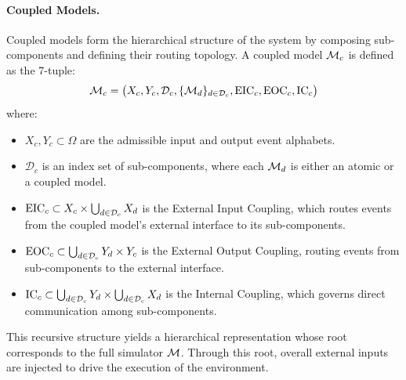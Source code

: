 \paragraph{Coupled Models.}
Coupled models form the hierarchical structure of the system by composing sub-components and defining their routing topology. A coupled model $\mathcal{M}_{c}$ is defined as the 7-tuple:
\[
\mathcal{M}_{c} = \bigl(X_c, Y_c, \mathcal{D}_c, \{\mathcal{M}_d\}_{d \in \mathcal{D}_c}, \mathrm{EIC}_c, \mathrm{EOC}_c, \mathrm{IC}_c \bigr)
\]
where:
\begin{itemize}[leftmargin=*]
    \item $X_c, Y_c \subset \Omega$ are the admissible input and output event alphabets.
    \item $\mathcal{D}_c$ is an index set of sub-components, where each $\mathcal{M}_d$ is either an atomic or a coupled model.
    \item $\mathrm{EIC}_c \subset X_c \times \bigcup_{d \in \mathcal{D}_c} X_d$ is the External Input Coupling, which routes events from the coupled model's external interface to its sub-components.
    \item $\mathrm{EOC}_c \subset \bigcup_{d \in \mathcal{D}_c} Y_d \times Y_c$ is the External Output Coupling, routing events from sub-components to the external interface.
    \item $\mathrm{IC}_c \subset \bigcup_{d \in \mathcal{D}_c} Y_d \times \bigcup_{d \in \mathcal{D}_c} X_d$ is the Internal Coupling, which governs direct communication among sub-components.
\end{itemize}

This recursive structure yields a hierarchical representation whose root corresponds to the full simulator $\mathcal{M}$. Through this root, overall external inputs are injected to drive the execution of the environment.